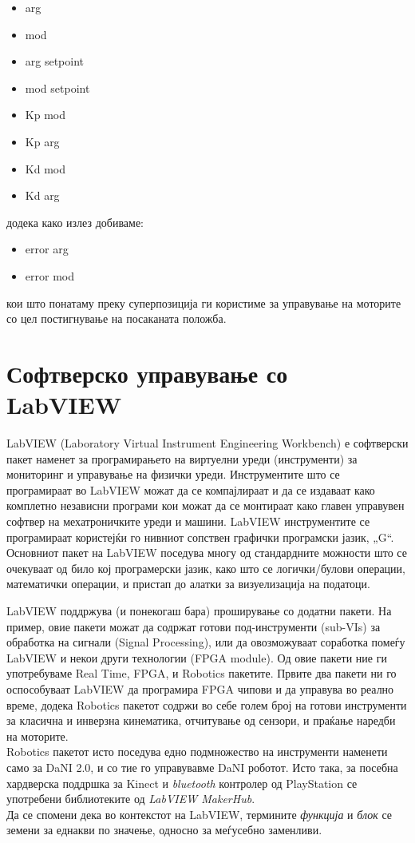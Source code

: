 \documentclass[12pt]{article}
\begin{document}
      \begin{itemize}
        \item arg
        \item mod
        \item arg setpoint
        \item mod setpoint
        \item Kp mod
        \item Kp arg
        \item Kd mod
        \item Kd arg
        \end{itemize}

      додека како излез добиваме:
      \begin{itemize}
        \item error arg
        \item error mod
        \end{itemize}
        кои што понатаму преку суперпозиција ги користиме за управување на моторите со цел постигнување на посаканата положба.

\newpage

\section{Софтверско управување со LabVIEW}
  LabVIEW (Laboratory Virtual Instrument Engineering Workbench) е софтверски пакет наменет за програмирањето на виртуелни уреди (инструменти) за мониторинг и управување на физички уреди. Инструментите што се програмираат во LabVIEW можат да се компајлираат и да се издаваат како комплетно независни програми кои можат да се монтираат како главен управувен софтвер на мехатроничките уреди и машини. LabVIEW инструментите се програмираат користејќи го нивниот сопствен графички програмски јазик, „G“.
  \\
  Основниот пакет на LabVIEW поседува многу од стандардните можности што се очекуваат од било кој програмерски јазик, како што се логички/булови операции, математички операции, и пристап до алатки за визуелизација на податоци.

  LabVIEW поддржува (и понекогаш бара) проширување со додатни пакети. На пример, овие пакети можат да содржат готови под-инструменти (sub-VIs) за обработка на сигнали (Signal Processing), или да овозможуваат соработка помеѓу LabVIEW и некои други технологии (FPGA module). Од овие пакети ние ги употребуваме Real Time, FPGA, и Robotics пакетите. Првите два пакети ни го оспособуваат LabVIEW да програмира FPGA чипови и да управува во реално време, додека Robotics пакетот содржи во себе голем број на готови инструменти за класична и инверзна кинематика, отчитување од сензори, и праќање наредби на моторите.
  \\
  Robotics пакетот исто поседува едно подмножество на инструменти наменети само за DaNI 2.0, и со тие го управувавме DaNI роботот. Исто така, за посебна хардверска поддршка за Kinect и \textit{bluetooth} контролер од PlayStation се употребени библиотеките од \textit{LabVIEW MakerHub}.
  \\
  Да се спомени дека во контекстот на LabVIEW, термините \textit{функција} и \textit{блок} се земени за еднакви по значење, односно за меѓусебно заменливи.
\end{document}
